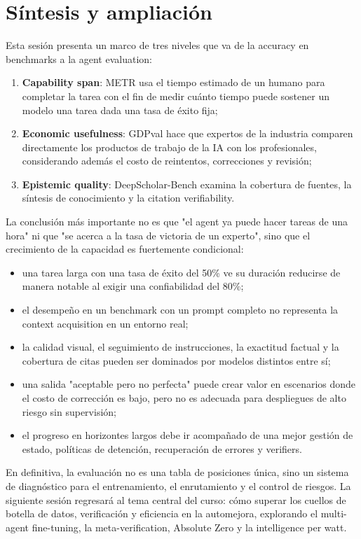 \section{Síntesis y ampliación}

Esta sesión presenta un marco de tres niveles que va de la accuracy en benchmarks a la agent evaluation:

\begin{enumerate}
    \item \textbf{Capability span}: METR usa el tiempo estimado de un humano para completar la tarea con el fin de medir cuánto tiempo puede sostener un modelo una tarea dada una tasa de éxito fija;
    \item \textbf{Economic usefulness}: GDPval hace que expertos de la industria comparen directamente los productos de trabajo de la IA con los profesionales, considerando además el costo de reintentos, correcciones y revisión;
    \item \textbf{Epistemic quality}: DeepScholar-Bench examina la cobertura de fuentes, la síntesis de conocimiento y la citation verifiability.
\end{enumerate}

La conclusión más importante no es que "el agent ya puede hacer tareas de una hora" ni que "se acerca a la tasa de victoria de un experto", sino que el crecimiento de la capacidad es fuertemente condicional:

\begin{itemize}
    \item una tarea larga con una tasa de éxito del 50\% ve su duración reducirse de manera notable al exigir una confiabilidad del 80\%;
    \item el desempeño en un benchmark con un prompt completo no representa la context acquisition en un entorno real;
    \item la calidad visual, el seguimiento de instrucciones, la exactitud factual y la cobertura de citas pueden ser dominados por modelos distintos entre sí;
    \item una salida "aceptable pero no perfecta" puede crear valor en escenarios donde el costo de corrección es bajo, pero no es adecuada para despliegues de alto riesgo sin supervisión;
    \item el progreso en horizontes largos debe ir acompañado de una mejor gestión de estado, políticas de detención, recuperación de errores y verifiers.
\end{itemize}

En definitiva, la evaluación no es una tabla de posiciones única, sino un sistema de diagnóstico para el entrenamiento, el enrutamiento y el control de riesgos. La siguiente sesión regresará al tema central del curso: cómo superar los cuellos de botella de datos, verificación y eficiencia en la automejora, explorando el multi-agent fine-tuning, la meta-verification, Absolute Zero y la intelligence per watt.


